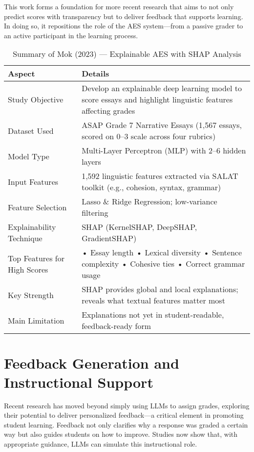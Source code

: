 This work forms a foundation for more recent research that aims to not only predict scores with transparency but to deliver feedback that supports learning. In doing so, it repositions the role of the AES system—from a passive grader to an active participant in the learning process.

\begin{table}[h]
  \centering
  \caption{Summary of Mok (2023) — Explainable AES with SHAP Analysis}
  \label{tab:mok2023_summary}
  \begin{tabular}{@{}p{4.5cm}p{10.5cm}@{}}
  \toprule
  \textbf{Aspect} & \textbf{Details} \\
  \midrule
  Study Objective & Develop an explainable deep learning model to score essays and highlight linguistic features affecting grades \\
  \midrule
  Dataset Used & ASAP Grade 7 Narrative Essays (1,567 essays, scored on 0–3 scale across four rubrics) \\
  \midrule
  Model Type & Multi-Layer Perceptron (MLP) with 2–6 hidden layers \\
  \midrule
  Input Features & 1,592 linguistic features extracted via SALAT toolkit (e.g., cohesion, syntax, grammar) \\
  \midrule
  Feature Selection & Lasso \& Ridge Regression; low-variance filtering \\
  \midrule
  Explainability Technique & SHAP (KernelSHAP, DeepSHAP, GradientSHAP) \\
  \midrule
  Top Features for High Scores & 
  • Essay length
  • Lexical diversity
  • Sentence complexity
  • Cohesive ties
  • Correct grammar usage \\
  \midrule
  Key Strength & SHAP provides global and local explanations; reveals what textual features matter most \\
  \midrule
  Main Limitation & Explanations not yet in student-readable, feedback-ready form \\
  \bottomrule
  \end{tabular}
\end{table}
  
\section{Feedback Generation and Instructional Support}
Recent research has moved beyond simply using LLMs to assign grades, exploring their potential to deliver personalized feedback—a critical element in promoting student learning. Feedback not only clarifies why a response was graded a certain way but also guides students on how to improve. Studies now show that, with appropriate guidance, LLMs can simulate this instructional role.

